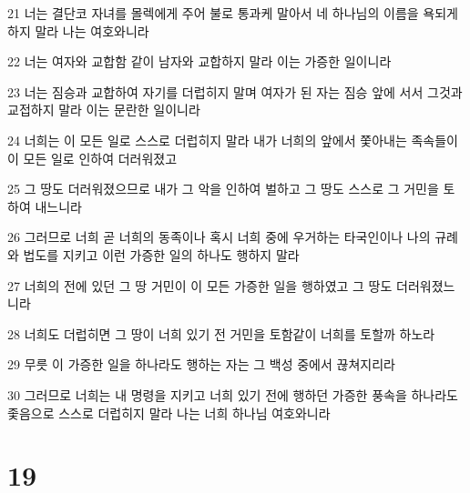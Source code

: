 \par 21 너는 결단코 자녀를 몰렉에게 주어 불로 통과케 말아서 네 하나님의 이름을 욕되게 하지 말라 나는 여호와니라
\par 22 너는 여자와 교합함 같이 남자와 교합하지 말라 이는 가증한 일이니라
\par 23 너는 짐승과 교합하여 자기를 더럽히지 말며 여자가 된 자는 짐승 앞에 서서 그것과 교접하지 말라 이는 문란한 일이니라
\par 24 너희는 이 모든 일로 스스로 더럽히지 말라 내가 너희의 앞에서 쫓아내는 족속들이 이 모든 일로 인하여 더러워졌고
\par 25 그 땅도 더러워졌으므로 내가 그 악을 인하여 벌하고 그 땅도 스스로 그 거민을 토하여 내느니라
\par 26 그러므로 너희 곧 너희의 동족이나 혹시 너희 중에 우거하는 타국인이나 나의 규례와 법도를 지키고 이런 가증한 일의 하나도 행하지 말라
\par 27 너희의 전에 있던 그 땅 거민이 이 모든 가증한 일을 행하였고 그 땅도 더러워졌느니라
\par 28 너희도 더럽히면 그 땅이 너희 있기 전 거민을 토함같이 너희를 토할까 하노라
\par 29 무릇 이 가증한 일을 하나라도 행하는 자는 그 백성 중에서 끊쳐지리라
\par 30 그러므로 너희는 내 명령을 지키고 너희 있기 전에 행하던 가증한 풍속을 하나라도 좇음으로 스스로 더럽히지 말라 나는 너희 하나님 여호와니라

\chapter{19}

